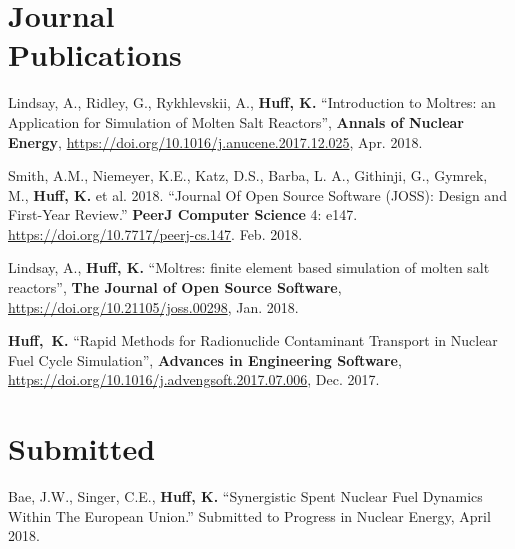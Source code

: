 \documentclass[margin,line]{resume}
\begin{document}
\begin{resume}
    \section{\mysidestyle Journal\\Publications}
      \begin{bibenum}
       \item Lindsay, A., Ridley, G., Rykhlevskii, A., \textbf{Huff, K.} 
               ``Introduction to Moltres: an Application for Simulation of 
               Molten Salt Reactors'',  \textbf{Annals of Nuclear Energy}, 
               \url{https://doi.org/10.1016/j.anucene.2017.12.025}, 
               Apr. 2018.
       \item Smith, A.M., Niemeyer, K.E., Katz, D.S., Barba, L. A., Githinji, 
               G., Gymrek, M., \textbf{Huff, K.} et al. 
              2018. ``Journal Of Open Source Software (JOSS): Design and 
              First-Year Review.'' \textbf{PeerJ Computer Science} 4: e147. 
              \url{https://doi.org/10.7717/peerj-cs.147}. Feb. 2018.
       \item Lindsay, A., \textbf{Huff, K.} 
               ``Moltres: finite element based simulation of molten salt 
               reactors'',  \textbf{The Journal of Open Source Software}, 
               \url{https://doi.org/10.21105/joss.00298}, Jan. 2018.
       \item \textbf{Huff,~K.} ``Rapid Methods for Radionuclide Contaminant 
               Transport in Nuclear Fuel Cycle Simulation'', \textbf{Advances 
               in Engineering Software}, 
               \url{https://doi.org/10.1016/j.advengsoft.2017.07.006}, Dec. 2017. 
      \end{bibenum}
      \vspace{2mm} %
      \section{\mysidestyle Submitted}
      \begin{bibenum}
      \item Bae, J.W., Singer, C.E., \textbf{Huff, K.} ``Synergistic Spent 
              Nuclear Fuel Dynamics Within The European Union.'' Submitted to 
              Progress in Nuclear Energy, April 2018.
      \end{bibenum}

\end{resume}
\end{document}
